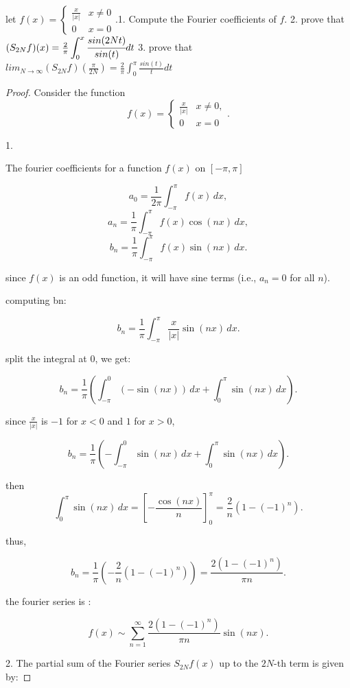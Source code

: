 \documentclass{article}
\begin{document}
let $f(x) = \begin{cases} \frac{x}{|x|} & x \neq 0 \\ 0 & x = 0 \end{cases}$.1.  Compute the Fourier coefficients of $f$.
2. prove that $(S_{2N}f)(x) = \frac{2}{\pi} \displaystyle\int_{0}^{x}\cfrac{sin(2Nt)}{sin(t)}dt$ 
3. prove that $lim_{N \to \infty} (S_{2N}f)(\frac{\pi}{2N}) = \frac{2}{\pi} \displaystyle\int_{0}^{\pi}\frac{sin(t)}{t}dt$
\begin{proof}
    


Consider the function 
\[
f(x) = \begin{cases} 
\frac{x}{|x|} & x \neq 0, \\
0 & x = 0 
\end{cases}.
\]

1.

The fourier coefficients for a function \(f(x)\) on \([- \pi, \pi]\) 

\[
a_0 = \frac{1}{2\pi} \int_{-\pi}^{\pi} f(x) \, dx,
\]
\[
a_n = \frac{1}{\pi} \int_{-\pi}^{\pi} f(x) \cos(nx) \, dx,
\]
\[
b_n = \frac{1}{\pi} \int_{-\pi}^{\pi} f(x) \sin(nx) \, dx.
\]

since \(f(x)\) is an odd function, it will have  sine terms (i.e., \(a_n = 0\) for all \(n\)).

computing bn: 

\[
b_n = \frac{1}{\pi} \int_{-\pi}^{\pi} \frac{x}{|x|} \sin(nx) \, dx.
\]

split the integral at \(0\), we get:

\[
b_n = \frac{1}{\pi} \left( \int_{-\pi}^{0} (-\sin(nx)) \, dx + \int_{0}^{\pi} \sin(nx) \, dx \right).
\]

since \(\frac{x}{|x|}\) is \(-1\) for \(x < 0\) and \(1\) for \(x > 0\),

\[
b_n = \frac{1}{\pi} \left( -\int_{-\pi}^{0} \sin(nx) \, dx + \int_{0}^{\pi} \sin(nx) \, dx \right).
\]

then
\[
\int_{0}^{\pi} \sin(nx) \, dx = \left[ -\frac{\cos(nx)}{n} \right]_{0}^{\pi} = \frac{2}{n} (1 - (-1)^n).
\]

thus,

\[
b_n = \frac{1}{\pi} \left( -\frac{2}{n}(1 - (-1)^n) \right) = \frac{2(1 - (-1)^n)}{\pi n}.
\]

the fourier series is : 

\[
f(x) \sim \sum_{n=1}^{\infty} \frac{2(1 - (-1)^n)}{\pi n} \sin(nx).
\]

2. 
The partial sum of the Fourier series \(S_{2N}f(x)\) up to the \(2N\)-th term is given by:


\end{proof}
\end{document}
